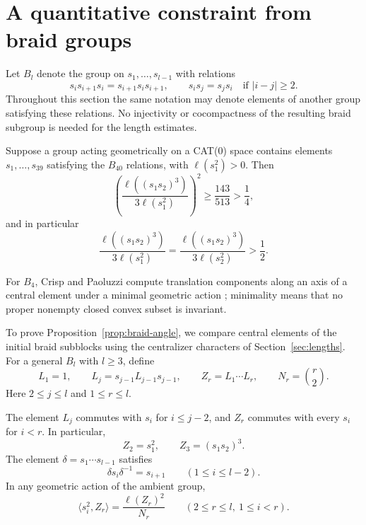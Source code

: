 \section{A quantitative constraint from braid groups}\label{sec:braids}

Let $B_l$ denote the group on $s_1,\ldots,s_{l-1}$ with relations
\[
 s_i s_{i+1}s_i=s_{i+1}s_i s_{i+1},\qquad
 s_i s_j=s_j s_i\quad\text{if }|i-j|\ge2.
\]
Throughout this section the same notation may denote elements of another
group satisfying these relations.  No injectivity or cocompactness of
the resulting braid subgroup is needed for the length estimates.

\begin{proposition}\label{prop:braid-angle}
Suppose a group acting geometrically on a CAT(0) space contains elements
$s_1,\ldots,s_{39}$ satisfying the $B_{40}$ relations, with
$\ell(s_1^2)>0$.  Then
\begin{equation}\label{eq:braid-angle-bound}
 \left(\frac{\ell((s_1s_2)^3)}{3\ell(s_1^2)}\right)^2
 \ge\frac{143}{513}>\frac14,
\end{equation}
and in particular
\[
 \frac{\ell((s_1s_2)^3)}{3\ell(s_1^2)}
 =\frac{\ell((s_1s_2)^3)}{3\ell(s_2^2)}>\frac12.
\]
\end{proposition}

For $B_4$, Crisp and Paoluzzi compute translation components along an
axis of a central element under a minimal geometric action
\cite[Proposition~5]{CrispPaoluzzi2005}; minimality means that no proper
nonempty closed convex subset is invariant.

To prove Proposition~\ref{prop:braid-angle}, we compare central elements
of the initial braid subblocks using the centralizer characters of
Section~\ref{sec:lengths}.  For a general $B_l$ with $l\ge3$, define
\begin{equation}\label{eq:braid-centers-definition}
 L_1=1,\qquad L_j=s_{j-1}L_{j-1}s_{j-1},\qquad
 Z_r=L_1\cdots L_r,\qquad N_r=\binom r2.
\end{equation}
Here $2\le j\le l$ and $1\le r\le l$.

\begin{lemma}\label{lem:braid-centers}
The element $L_j$ commutes with $s_i$ for $i\le j-2$, and $Z_r$ commutes
with every $s_i$ for $i<r$.  In particular,
\[
 Z_2=s_1^2,\qquad Z_3=(s_1s_2)^3.
\]
The element $\delta=s_1\cdots s_{l-1}$ satisfies
\begin{equation}\label{eq:braid-shift}
 \delta s_i\delta^{-1}=s_{i+1}\qquad(1\le i\le l-2).
\end{equation}
In any geometric action of the ambient group,
\begin{equation}\label{eq:braid-central-pairing}
 \langle s_i^2,Z_r\rangle=\frac{\ell(Z_r)^2}{N_r}
 \qquad(2\le r\le l,\ 1\le i<r).
\end{equation}
\end{lemma}

